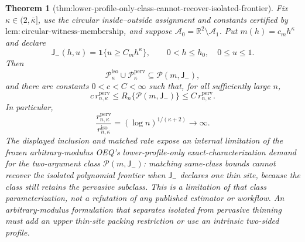 \documentclass{article}
\newtheorem{theorem}{Theorem}
\begin{document}
\begin{theorem}[thm:lower-profile-only-class-cannot-recover-isolated-frontier]\label{thm:lower-profile-only-class-cannot-recover-isolated-frontier}
Fix \(\kappa\in(2,\overline\kappa]\), use the circular inside--outside assignment and constants certified by \(\mathrm{lem:circular\text{-}witness\text{-}membership}\), and suppose \(\mathcal A_0=\mathbb R^2\setminus\mathcal A_1\).  Put \(m(h)=c_mh^\kappa\) and declare
\[
 \mathsf J_{-}(h,u)=\mathbf 1\{u\ge C_mh^\kappa\},
 \qquad 0<h\le h_0,\quad 0\le u\le1.
\]
Then
\[
 \mathcal P_{\kappa}^{\mathrm{iso}}\cup
 \mathcal P_{\kappa}^{\mathrm{perv}}
 \subseteq \mathcal P(m,\mathsf J_{-}),
\]
and there are constants \(0<c<C<\infty\) such that, for all sufficiently large \(n\),
\[
 c\,r_{n,\kappa}^{\mathrm{perv}}
 \le R_n\{\mathcal P(m,\mathsf J_{-})\}
 \le C\,r_{n,\kappa}^{\mathrm{perv}}.
\]
In particular,
\[
 \frac{r_{n,\kappa}^{\mathrm{perv}}}
 {r_{n,\kappa}^{\mathrm{iso}}}
 =(\log n)^{1/(\kappa+2)}\longrightarrow\infty.
\]
The displayed inclusion and matched rate expose an internal limitation of the frozen arbitrary-modulus OEQ's lower-profile-only exact-characterization demand for the two-argument class \(\mathcal P(m,\mathsf J_{-})\): matching same-class bounds cannot recover the isolated polynomial frontier when \(\mathsf J_{-}\) declares one thin site, because the class still retains the pervasive subclass. This is a limitation of that class parameterization, not a refutation of any published estimator or workflow. An arbitrary-modulus formulation that separates isolated from pervasive thinning must add an upper thin-site packing restriction or use an intrinsic two-sided profile.
\end{theorem}
\end{document}
